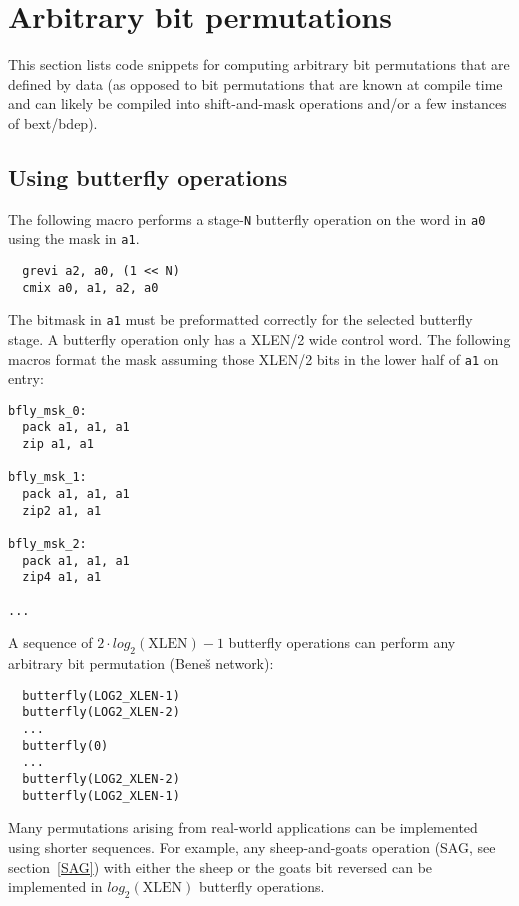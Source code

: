 
\section{Arbitrary bit permutations}

This section lists code snippets for computing arbitrary bit permutations that
are defined by data (as opposed to bit permutations that are known at compile
time and can likely be compiled into shift-and-mask operations and/or a few
instances of bext/bdep).

\subsection{Using butterfly operations}
\label{butterfly}

The following macro performs a stage-{\tt N} butterfly operation on the word in
{\tt a0} using the mask in {\tt a1}.

\begin{verbatim}
  grevi a2, a0, (1 << N)
  cmix a0, a1, a2, a0
\end{verbatim}

The bitmask in {\tt a1} must be preformatted correctly for the selected butterfly
stage. A butterfly operation only has a XLEN/2 wide control word. The following
macros format the mask assuming those XLEN/2 bits in the lower half of {\tt a1}
on entry:

\begin{verbatim}
bfly_msk_0:
  pack a1, a1, a1
  zip a1, a1

bfly_msk_1:
  pack a1, a1, a1
  zip2 a1, a1

bfly_msk_2:
  pack a1, a1, a1
  zip4 a1, a1

...
\end{verbatim}

A sequence of $2\cdot{}log_2(\textrm{XLEN})-1$ butterfly operations can perform any
arbitrary bit permutation (Bene{\v s} network):

\begin{verbatim}
  butterfly(LOG2_XLEN-1)
  butterfly(LOG2_XLEN-2)
  ...
  butterfly(0)
  ...
  butterfly(LOG2_XLEN-2)
  butterfly(LOG2_XLEN-1)
\end{verbatim}


Many permutations arising from real-world applications can be implemented
using shorter sequences. For example, any sheep-and-goats operation (SAG, see section~\ref{SAG})
with either the sheep or the goats bit reversed can be implemented in $log_2(\textrm{XLEN})$
butterfly operations.

